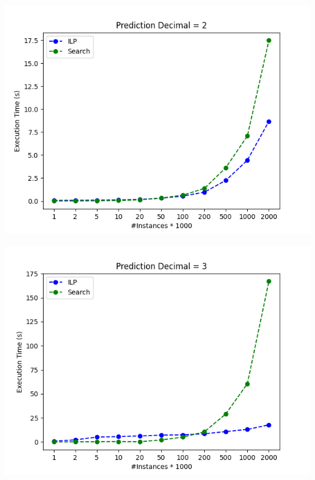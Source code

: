 \documentclass[a4paper]{article}
\begin{document}
\begin{center}
	\includegraphics[]{figure_2}
\end{center}

\begin{center}
	\includegraphics[]{figure_3}
\end{center}


\pagebreak
\end{document}
